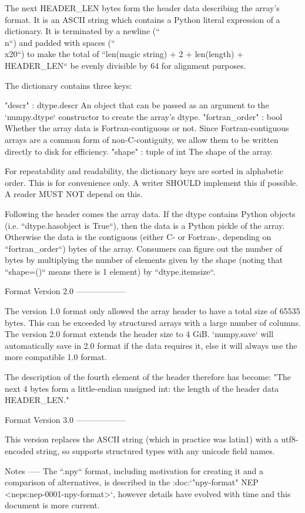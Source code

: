 \begin{DoxyVerb}
The next HEADER_LEN bytes form the header data describing the array's
format. It is an ASCII string which contains a Python literal expression
of a dictionary. It is terminated by a newline (``\\n``) and padded with
spaces (``\\x20``) to make the total of
``len(magic string) + 2 + len(length) + HEADER_LEN`` be evenly divisible
by 64 for alignment purposes.

The dictionary contains three keys:

    "descr" : dtype.descr
      An object that can be passed as an argument to the `numpy.dtype`
      constructor to create the array's dtype.
    "fortran_order" : bool
      Whether the array data is Fortran-contiguous or not. Since
      Fortran-contiguous arrays are a common form of non-C-contiguity,
      we allow them to be written directly to disk for efficiency.
    "shape" : tuple of int
      The shape of the array.

For repeatability and readability, the dictionary keys are sorted in
alphabetic order. This is for convenience only. A writer SHOULD implement
this if possible. A reader MUST NOT depend on this.

Following the header comes the array data. If the dtype contains Python
objects (i.e. ``dtype.hasobject is True``), then the data is a Python
pickle of the array. Otherwise the data is the contiguous (either C-
or Fortran-, depending on ``fortran_order``) bytes of the array.
Consumers can figure out the number of bytes by multiplying the number
of elements given by the shape (noting that ``shape=()`` means there is
1 element) by ``dtype.itemsize``.

Format Version 2.0
------------------

The version 1.0 format only allowed the array header to have a total size of
65535 bytes.  This can be exceeded by structured arrays with a large number of
columns.  The version 2.0 format extends the header size to 4 GiB.
`numpy.save` will automatically save in 2.0 format if the data requires it,
else it will always use the more compatible 1.0 format.

The description of the fourth element of the header therefore has become:
"The next 4 bytes form a little-endian unsigned int: the length of the header
data HEADER_LEN."

Format Version 3.0
------------------

This version replaces the ASCII string (which in practice was latin1) with
a utf8-encoded string, so supports structured types with any unicode field
names.

Notes
-----
The ``.npy`` format, including motivation for creating it and a comparison of
alternatives, is described in the
:doc:`"npy-format" NEP <neps:nep-0001-npy-format>`, however details have
evolved with time and this document is more current.\end{DoxyVerb}
 

